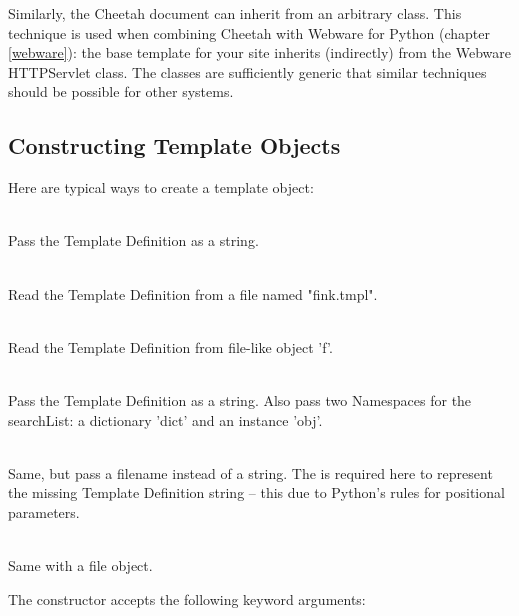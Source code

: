 Similarly, the Cheetah document can inherit from an arbitrary class. This
technique is used when combining Cheetah with Webware for Python
(chapter \ref{webware}): the base template for your site inherits (indirectly)
from the Webware HTTPServlet class.  The classes are sufficiently generic that
similar techniques should be possible for other systems.

\subsection{Constructing Template Objects}
\label{howWorks.constructing}

Here are typical ways to create a template object:
\begin{description}
\item{}
     \\ Pass the Template Definition as a string.
\item{}
     \\ Read the Template Definition from a file named "fink.tmpl".  
\item{}
     \\ Read the Template Definition from file-like object 'f'.
\item{}
     \\ Pass the Template Definition as a string.  Also pass two Namespaces for
     the searchList: a dictionary 'dict' and an instance 'obj'.
\item{}
     \\ Same, but pass a filename instead of a string.  The  is
     required here to represent the missing Template Definition string -- this
     due to Python's rules for positional parameters.
\item{}
     \\ Same with a file object.
\end{description}

The constructor accepts the following keyword arguments:

